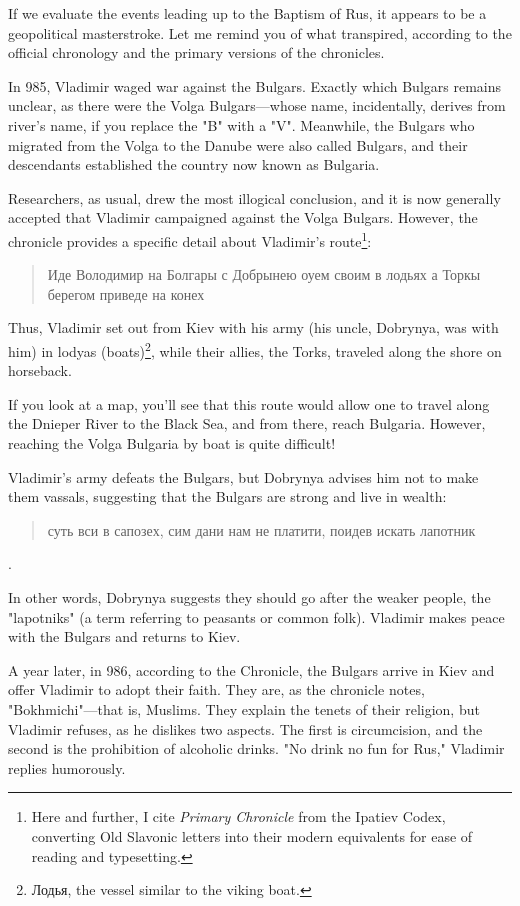 \documentclass[a5paper,11pt,openany]{article}
\begin{document}
If we evaluate the events leading up to the Baptism of Rus, it appears to be a geopolitical masterstroke. Let me remind you of what transpired, according to the official chronology and the primary versions of the chronicles.

In 985, Vladimir waged war against the Bulgars. Exactly which Bulgars remains unclear, as there were the Volga Bulgars—whose name, incidentally, derives from river's name, if you replace the "B" with a "V". Meanwhile, the Bulgars who migrated from the Volga to the Danube were also called Bulgars, and their descendants established the country now known as Bulgaria.

Researchers, as usual, drew the most illogical conclusion, and it is now generally accepted that Vladimir campaigned against the Volga Bulgars. However, the chronicle provides a specific detail about Vladimir’s route\footnote{Here and further, I cite \textit{Primary Chronicle} from the Ipatiev Codex, converting Old Slavonic letters into their modern equivalents for ease of reading and typesetting.}:

\begin{quotation}
\noindent Иде Володимир на Болгары с
Добрынею оуем своим в лодьях а Торкы берегом приведе на конех
\end{quotation}

Thus, Vladimir set out from Kiev with his army (his uncle, Dobrynya, was with him) in lodyas (boats)\footnote{Лодья, the vessel similar to the viking boat.}, while their allies, the Torks, traveled along the shore on horseback.

If you look at a map, you'll see that this route would allow one to travel along the Dnieper River to the Black Sea, and from there, reach Bulgaria. However, reaching the Volga Bulgaria by boat is quite difficult!

Vladimir's army defeats the Bulgars, but Dobrynya advises him not to make them vassals, suggesting that the Bulgars are strong and live in wealth:

\begin{quotation}
\noindent суть вси в сапозех, сим дани нам не платити, поидев искать лапотник
\end{quotation}. 

In other words, Dobrynya suggests they should go after the weaker people, the "lapotniks" (a term referring to peasants or common folk). Vladimir makes peace with the Bulgars and returns to Kiev.

A year later, in 986, according to the Chronicle, the Bulgars arrive in Kiev and offer Vladimir to adopt their faith. They are, as the chronicle notes, "Bokhmichi"—that is, Muslims. They explain the tenets of their religion, but Vladimir refuses, as he dislikes two aspects. The first is circumcision, and the second is the prohibition of alcoholic drinks. "No drink no fun for Rus," Vladimir replies humorously.
\end{document}

